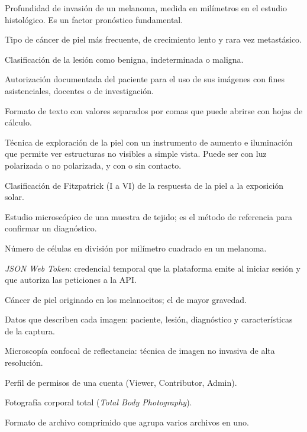 \documentclass[11pt,a4paper]{article}
\begin{document}
\begin{description}[style=nextline, leftmargin=1.5em, itemsep=1pt, topsep=2pt]
  \item[Breslow (espesor de)] Profundidad de invasión de un melanoma, medida en
  milímetros en el estudio histológico. Es un factor pronóstico fundamental.
  \item[Carcinoma basocelular] Tipo de cáncer de piel más frecuente, de
  crecimiento lento y rara vez metastásico.
  \item[Categoría diagnóstica] Clasificación de la lesión como benigna,
  indeterminada o maligna.
  \item[Consentimiento informado] Autorización documentada del paciente para el
  uso de sus imágenes con fines asistenciales, docentes o de investigación.
  \item[CSV] Formato de texto con valores separados por comas que puede abrirse con
  hojas de cálculo.
  \item[Dermatoscopia] Técnica de exploración de la piel con un instrumento de
  aumento e iluminación que permite ver estructuras no visibles a simple vista.
  Puede ser con luz polarizada o no polarizada, y con o sin contacto.
  \item[Fototipo] Clasificación de Fitzpatrick (I a VI) de la respuesta de la piel a
  la exposición solar.
  \item[Histopatología] Estudio microscópico de una muestra de tejido; es el
  método de referencia para confirmar un diagnóstico.
  \item[Índice mitótico] Número de células en división por milímetro cuadrado en
  un melanoma.
  \item[JWT] \textit{JSON Web Token}: credencial temporal que la plataforma emite al
  iniciar sesión y que autoriza las peticiones a la API.
  \item[Melanoma] Cáncer de piel originado en los melanocitos; el de mayor
  gravedad.
  \item[Metadatos] Datos que describen cada imagen: paciente, lesión, diagnóstico
  y características de la captura.
  \item[RCM] Microscopía confocal de reflectancia: técnica de imagen no invasiva de
  alta resolución.
  \item[Rol] Perfil de permisos de una cuenta (Viewer, Contributor, Admin).
  \item[TBP] Fotografía corporal total (\textit{Total Body Photography}).
  \item[ZIP] Formato de archivo comprimido que agrupa varios archivos en uno.
\end{description}
\end{document}
